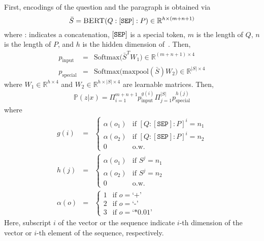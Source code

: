 \documentclass[11pt,a4paper]{article}
\begin{document}
First, \bert{} encodings of the question and the paragraph is obtained via \begin{equation*}
    \bar{S} = \textsc{BERT} (Q:{\tt [SEP]}:P) \in \mathbb{R}^{h \times (m+n+1)}
\end{equation*}
where : indicates a concatenation, ${\tt [SEP]}$ is a special token, $m$ is the length of $Q$, $n$ is the length of $P$, and $h$ is the hidden dimension of~\bert. Then, 
\begin{eqnarray*}
    p_\text{input} &=& \mathrm{Softmax} \big( \bar{S}^T W_1  \big) \in \mathbb{R}^{(m+n+1) \times 4} \\
    p_\text{special} &=& \mathrm{Softmax} \big( \mathrm{maxpool}(\bar{S}) W_2 \big) \in \mathbb{R}^{|S| \times 4}
\end{eqnarray*}
where $W_1 \in \mathbb{R}^{h \times 4}$ and $W_2 \in \mathbb{R}^{h \times |S| \times 4}$ are learnable matrices. Then,
\begin{eqnarray*}
    \mathbb{P}(z|x) = \Pi_{i=1}^{m+n+1} p_\text{input}^{g(i)} \Pi_{j=1}^{|S|} p_\text{special}^{h(j)}
\end{eqnarray*}
where
\begin{eqnarray*}
    g(i) &=&  \begin{cases}
                \alpha(o_1)  & \text{if } [Q:[\texttt{SEP}]:P]^i=n_1 \\
                \alpha(o_2)  & \text{if } [Q:[\texttt{SEP}]:P]^i=n_2 \\
                0       & \text{o.w.}
            \end{cases} \\
    h(j) &=&  \begin{cases}
                \alpha(o_1)  & \text{if } S^j=n_1 \\
                \alpha(o_2)  & \text{if } S^j=n_2 \\
                0       & \text{o.w.}
            \end{cases} \\
    \alpha(o) &=&  \begin{cases}
                1  & \text{if } o=\text{`+'} \\
                2  & \text{if } o=\text{`-'} \\
                3  & \text{if } o=\text{`*0.01'}
            \end{cases}
\end{eqnarray*}
Here, subscript $i$ of the vector or the sequence indicate $i$-th dimension of the vector or $i$-th element of the sequence, respectively.
\end{document}
